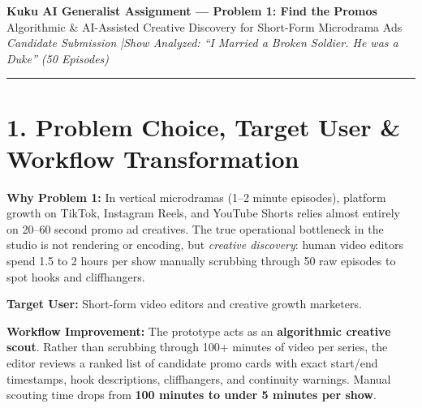 \documentclass[10pt,a4paper]{article}
\begin{document}
\begin{center}
    {\LARGE \textbf{Kuku AI Generalist Assignment — Problem 1: Find the Promos}}\\[0.2em]
    {\normalsize Algorithmic \& AI-Assisted Creative Discovery for Short-Form Microdrama Ads}\\[0.2em]
    \textit{Candidate Submission \quad|\quad Show Analyzed: ``I Married a Broken Soldier. He was a Duke'' (50 Episodes)}
\end{center}
\vspace{-0.6em}
\rule{\textwidth}{1.0pt}

\section*{1. Problem Choice, Target User \& Workflow Transformation}
\textbf{Why Problem 1:} In vertical microdramas (1--2 minute episodes), platform growth on TikTok, Instagram Reels, and YouTube Shorts relies almost entirely on 20--60 second promo ad creatives. The true operational bottleneck in the studio is not rendering or encoding, but \textit{creative discovery}: human video editors spend 1.5 to 2 hours per show manually scrubbing through 50 raw episodes to spot hooks and cliffhangers.

\textbf{Target User:} Short-form video editors and creative growth marketers.

\textbf{Workflow Improvement:} The prototype acts as an \textbf{algorithmic creative scout}. Rather than scrubbing through 100+ minutes of video per series, the editor reviews a ranked list of candidate promo cards with exact start/end timestamps, hook descriptions, cliffhangers, and continuity warnings. Manual scouting time drops from \textbf{100 minutes to under 5 minutes per show}.
\end{document}
